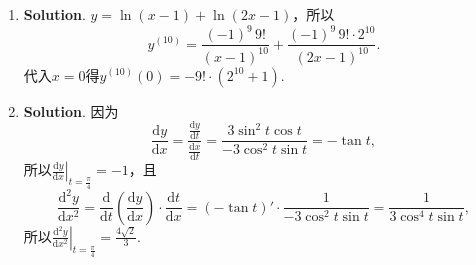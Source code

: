 \documentclass[../main.tex]{subfiles}
\begin{document}
\begin{enumerate}
    \item \textbf{Solution}. $y=\ln(x-1)+\ln(2x-1)$，所以
          \[
              y^{(10)}=\frac{(-1)^{9}\,9!}{(x-1)^{10}}+\frac{(-1)^{9}\,9!\cdot 2^{10}}{(2x-1)^{10}}
              .
          \]
          代入$x=0$得$y^{(10)}(0)=-9!\cdot(2^{10}+1)$.

    \item \textbf{Solution}. 因为
          \[
              \frac{\mathrm{d}y}{\mathrm{d}x}=\frac{\frac{\mathrm{d}y}{\mathrm{d}t}}{\frac{\mathrm{d}x}{\mathrm{d}t}}
              =\frac{3\sin^{2} t\cos t}{-3\cos^{2} t\sin t}=-\tan t,
          \]
          所以$\left.\frac{\mathrm{d}y}{\mathrm{d}x}
              \right|_{t=\frac{\pi}{4}}=-1$，且
          \[
              \frac{\mathrm{d}^{2}y}{\mathrm{d}x^{2}}=\frac{\mathrm{d}}{\mathrm{d}t}\left
              (\frac{\mathrm{d}y}{\mathrm{d}x}\right)\cdot\frac{\mathrm{d}t}{\mathrm{d}x}
              =\left(-\tan t\right)'\cdot\frac{1}{-3\cos^{2} t\sin t}=\frac{1}{3\cos^{4}
                  t\sin t},
          \]
          所以$\left.\frac{\mathrm{d}^{2}y}{\mathrm{d}x^{2}}\right|_{t=\frac{\pi}{4}}
              =\frac{4\sqrt{2}}{3}$.
\end{enumerate}
\end{document}
